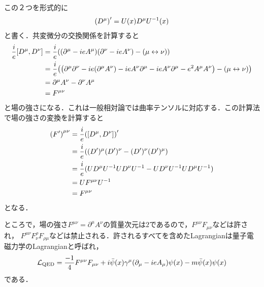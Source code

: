 	この２つを形式的に
	\begin{align}
			\qty(D^{\mu})' = U(x)D^{\mu}U^{-1}(x)
	\end{align}
	と書く．共変微分の交換関係を計算すると
	\begin{align}
			\frac{i}{e}\qty[D^{\mu}, D^{\nu}]
			&=\frac{i}{e}\qty(\qty(\partial^{\mu} - ieA^{\mu})\qty(\partial^{\nu} - ieA^{\nu}) - (\mu \leftrightarrow \nu))\\
			&=\frac{i}{e}\qty(\qty(\partial^{\mu}\partial^{\nu} - ie\qty(\partial^{\mu}A^{\nu}) -ieA^{\nu}\partial^{\mu} - ieA^{\nu}\partial^{\mu} - e^2A^{\mu}A^{\nu}) - (\mu \leftrightarrow \nu))\\
			&=\partial^{\mu}A^{\nu} - \partial^{\nu}A^{\mu}\\
			&= F^{\mu\nu}
	\end{align}
	と場の強さになる．これは一般相対論では曲率テンソルに対応する．この計算法で場の強さの変換を計算すると
	\begin{align}
			\qty(F')^{\mu\nu}
			&= \frac{i}{e}\qty([D^{\mu}, D^{\nu}])'\\
			&= \frac{i}{e}((D')^{\mu}(D')^{\nu} - (D')^{\nu}(D')^{\mu})\\
			&= \frac{i}{e}(UD^{\mu}U^{-1}UD^{\nu}U^{-1} - UD^{\nu}U^{-1}UD^{\mu}U^{-1})\\
			&= UF^{\mu\nu}U^{-1}\\
			&= F^{\mu\nu}
	\end{align}
	となる．

	ところで，場の強さ$F^{\mu\nu} = \partial^{\mu}A^{\nu}$の質量次元は$2$であるので，$F^{\mu\nu}F_{\mu\nu}$などは許され，
	$F^{\mu\nu}F_{\nu}^{\rho}F_{\rho\mu}$などは禁止される．許されるすべてを含めたLagrangianは量子電磁力学のLagrangianと呼ばれ，
	\begin{align}
			\mathcal{L}_{\text{QED}} = \frac{-1}{4}F^{\mu\nu}F_{\mu\nu} + i\bar{\psi}(x)\gamma^{\mu}\qty(\partial_{\mu} - ieA_{\mu})\psi(x) - m\bar{\psi}(x)\psi(x)
	\end{align}
	である．



